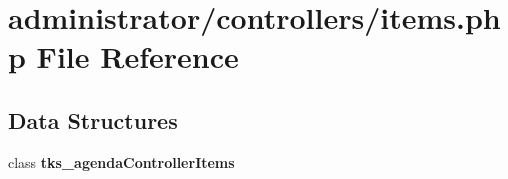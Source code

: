 \section{administrator/controllers/items.php File Reference}
\label{administrator_2controllers_2items_8php}
\subsection*{Data Structures}
\begin{DoxyCompactItemize}
\item 
class \textbf{ tks\+\_\+agenda\+Controller\+Items}
\end{DoxyCompactItemize}
